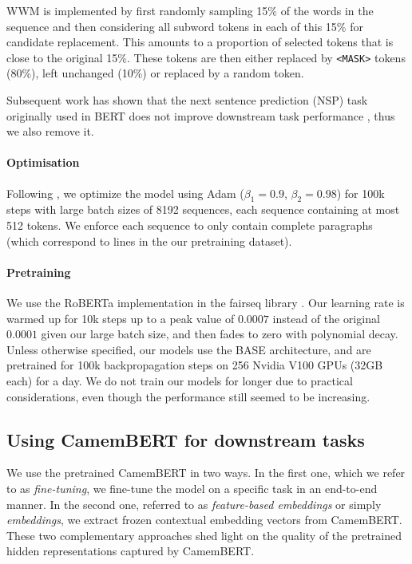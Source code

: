 \documentclass[11pt,a4paper]{article}
\newcommand{\camembert}{CamemBERT\xspace}
\newcommand{\roberta}{RoBERTa\xspace}
\newcommand{\bert}{BERT\xspace}
\begin{document}
WWM is implemented by first randomly sampling 15\% of the words in the sequence and then considering all subword tokens in each of this 15\% for candidate replacement. This amounts to a proportion of selected tokens that is close to the original 15\%.
These tokens are then either replaced by \texttt{<MASK>} tokens (80\%), left unchanged (10\%) or replaced by a random token.

Subsequent work has shown that the next sentence prediction (NSP) task originally used in \bert does not improve downstream task performance \cite{lample2019cross,liu2019roberta}, thus we also remove it.



\paragraph{Optimisation}
Following \citep{liu2019roberta}, we optimize the model using Adam \cite{kingma2014adam} ($\beta_1 = 0.9$, $\beta_2 = 0.98$) for 100k steps with large batch sizes of 8192 sequences, each sequence containing at most 512 tokens.
We enforce each sequence to only contain complete paragraphs (which correspond to lines in the our pretraining dataset).

\paragraph{Pretraining}
We use the \roberta implementation in the fairseq library \cite{ott2019fairseq}.
Our learning rate is warmed up for 10k steps up to a peak value of $0.0007$ instead of the original $0.0001$ given our large batch size, and then fades to zero with polynomial decay.
Unless otherwise specified, our models use the BASE architecture, and are pretrained for 100k backpropagation steps on 256 Nvidia V100 GPUs (32GB each) for a day.
We do not train our models for longer due to practical considerations, even though the performance still seemed to be increasing.

\subsection{Using \camembert for downstream tasks}
We use the pretrained \camembert in two ways. In the first one, which we refer to as \textit{fine-tuning}, we fine-tune the model on a specific task in an end-to-end manner. In the second one, referred to as \textit{feature-based embeddings} or simply \textit{embeddings}, we extract frozen contextual embedding vectors from \camembert.
These two complementary approaches shed light on the quality of the pretrained hidden representations captured by \camembert.
\end{document}
